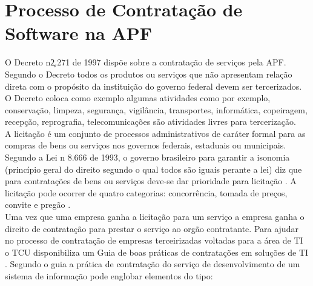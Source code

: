 \section{Processo de Contratação de Software na APF}
O Decreto n\c 2.271 de 1997 \cite{decreto_2271} dispõe sobre a contratação de serviços pela APF. Segundo o Decreto todos os produtos ou serviços que não apresentam relação direta com o propósito da instituição do governo federal devem ser tercerizados. O Decreto coloca como exemplo algumas atividades como por exemplo, conservação, limpeza, segurança, vigilância, transportes, informática, copeiragem, recepção, reprografia, telecomunicações são atividades livres para tercerização.
\\A licitação é um conjunto de processos administrativos de caráter formal para as compras de bens ou serviços nos governos federais, estaduais ou municipais. Segundo a Lei  n 8.666 de 1993, o governo brasileiro para garantir a isonomia (princípio geral do direito segundo o qual todos são iguais perante a lei) diz que para contratações de bens ou serviços deve-se dar prioridade para licitação \cite{Lei_1993}. A licitação pode ocorrer de quatro categorias: concorrência, tomada de preços, convite e pregão \cite{brazil_licitacoes_2010}.
\\Uma vez que uma empresa ganha a licitação para um serviço a empresa ganha o direito de contratação para prestar o serviço ao orgão contratante. Para ajudar no processo de contratação de empresas terceirizadas voltadas para a área de TI o TCU disponibiliza um Guia de boas práticas de contratações em soluções de TI \cite{guia_boas_praticas}. Segundo o guia a prática de contratação do serviço de desenvolvimento de um sistema de informação pode englobar elementos do tipo:
